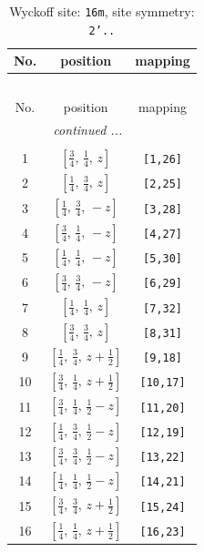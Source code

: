 \documentclass[fleqn,8pt]{jsarticle}
\begin{document}
\renewcommand{\arraystretch}{1.2}
\begin{longtable}{ccc}
\caption{Wyckoff site: {\tt 16m}, site symmetry: {\tt 2'..}}
 \\
 \hline \hline
No. & position & mapping \\ \hline \endfirsthead

\multicolumn{2}{l}{\tablename\ \thetable{}} \\
 \hline \hline
No. & position & mapping \\ \hline \endhead

 \hline \hline
\multicolumn{2}{r}{\footnotesize\it continued ...} \\ \endfoot

 \hline \hline
\multicolumn{2}{r}{} \\ \endlastfoot

1 & $\left[ \frac{3}{4},\, \frac{1}{4},\, z \right]$ & {\tt [1,26]} \\ \hline
2 & $\left[ \frac{1}{4},\, \frac{3}{4},\, z \right]$ & {\tt [2,25]} \\ \hline
3 & $\left[ \frac{1}{4},\, \frac{3}{4},\, - z \right]$ & {\tt [3,28]} \\ \hline
4 & $\left[ \frac{3}{4},\, \frac{1}{4},\, - z \right]$ & {\tt [4,27]} \\ \hline
5 & $\left[ \frac{1}{4},\, \frac{1}{4},\, - z \right]$ & {\tt [5,30]} \\ \hline
6 & $\left[ \frac{3}{4},\, \frac{3}{4},\, - z \right]$ & {\tt [6,29]} \\ \hline
7 & $\left[ \frac{1}{4},\, \frac{1}{4},\, z \right]$ & {\tt [7,32]} \\ \hline
8 & $\left[ \frac{3}{4},\, \frac{3}{4},\, z \right]$ & {\tt [8,31]} \\ \hline
9 & $\left[ \frac{1}{4},\, \frac{3}{4},\, z + \frac{1}{2} \right]$ & {\tt [9,18]} \\ \hline
10 & $\left[ \frac{3}{4},\, \frac{1}{4},\, z + \frac{1}{2} \right]$ & {\tt [10,17]} \\ \hline
11 & $\left[ \frac{3}{4},\, \frac{1}{4},\, \frac{1}{2} - z \right]$ & {\tt [11,20]} \\ \hline
12 & $\left[ \frac{1}{4},\, \frac{3}{4},\, \frac{1}{2} - z \right]$ & {\tt [12,19]} \\ \hline
13 & $\left[ \frac{3}{4},\, \frac{3}{4},\, \frac{1}{2} - z \right]$ & {\tt [13,22]} \\ \hline
14 & $\left[ \frac{1}{4},\, \frac{1}{4},\, \frac{1}{2} - z \right]$ & {\tt [14,21]} \\ \hline
15 & $\left[ \frac{3}{4},\, \frac{3}{4},\, z + \frac{1}{2} \right]$ & {\tt [15,24]} \\ \hline
16 & $\left[ \frac{1}{4},\, \frac{1}{4},\, z + \frac{1}{2} \right]$ & {\tt [16,23]} \\
\end{longtable}
\end{document}
